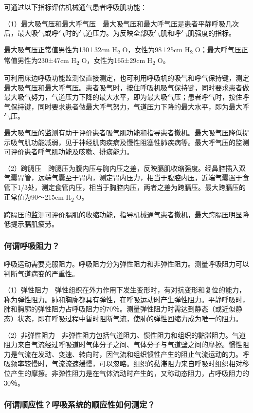 可通过以下指标评估机械通气患者呼吸肌功能：

（1）最大吸气压和最大呼气压　最大吸气压和最大呼气压是患者平静呼吸几次后，最大吸气或呼气时的气道压力。为反映全部吸气肌和呼气肌强度的指标。

最大吸气压正常值男性为130±32cm H\textsubscript{2} O，女性为98±25cm
H\textsubscript{2} O；最大呼气压正常值男性为230±47cm H\textsubscript{2}
O，女性为165±29cm H\textsubscript{2} O。

可利用床边呼吸功能监测仪直接测定，也可利用呼吸机的吸气和呼气保持键，测定最大吸气压和最大呼气压。患者吸气时，按住呼吸机吸气保持键，同时要求患者做最大吸气努力，气道压力下降的最大水平，即为最大吸气压；患者呼气时，按住呼气保持键，同时要求患者做最大呼气努力，气道压力下降的最大水平，即为最大呼气压。

最大吸气压的监测有助于评价患者吸气肌功能和指导患者撤机。最大吸气压降低提示吸气肌功能减弱，见于神经肌肉疾病及慢性阻塞性肺疾病等。最大呼气压的监测可评价患者呼气肌功能及咳嗽、排痰能力。

（2）跨膈压　跨膈压为腹内压与胸内压之差，反映膈肌收缩强度。经鼻腔插入双气囊胃管，远端气囊至于胃内，测定胃内压力，相当于腹腔内压，近端气囊置于食管下1/3处，测定食管内压，相当于胸腔内压，两者之差为跨膈压。最大跨膈压的正常值为90～215cm
H\textsubscript{2} O。

跨膈压的监测可评价膈肌的收缩功能，指导机械通气患者撤机，最大跨膈压明显降低提示膈肌疲劳。

\subsubsection{何谓呼吸阻力？}

呼吸运动需要克服阻力。呼吸阻力分为弹性阻力和非弹性阻力。测量呼吸阻力可以判断气道病变的严重性。

（1）弹性阻力　弹性组织在外力作用下发生变形时，有对抗变形和复位的能力，称为弹性阻力。肺和胸廓都具有弹性，在呼吸运动时产生弹性阻力。平静呼吸时，肺和胸廓的弹性阻力占呼吸阻力的70％。测量弹性阻力时需达到静态（或近似静态）状态，即在呼吸过程中暂时阻断气流，使肺的弹性回缩力成为唯一的阻力。

（2）非弹性阻力　非弹性阻力包括气道阻力、惯性阻力和组织的黏滞阻力。气道阻力来自气流经过呼吸道时气体分子之间、气体分子与气道壁之间的摩擦。惯性阻力是气流在发动、变速、转向时，因气流和组织惯性产生的阻止气流运动的力。呼吸频率较慢时，气流流速缓慢，可以忽略。组织的黏滞阻力来自呼吸时组织相对移位产生的摩擦。非弹性阻力是在气体流动时产生的，又称动态阻力，占呼吸阻力的30％。

\subsubsection{何谓顺应性？呼吸系统的顺应性如何测定？}

